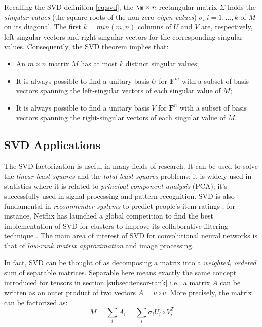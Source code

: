 Recalling the SVD definition \ref{eq:svd}, the $\m \times n$ rectangular matrix $\Sigma$ holds the  \emph{singular values} (the square roots of the non-zero \emph{eigen-values})  $\sigma_i \: i=1, \ldots, k$ of $M$ on its diagonal. The first $k = min(m,n)$ columns of $U$ and $V$ are, respectively, left-singular vectors and right-singular vectors for the corresponding singular values. Consequently, the SVD theorem implies that: 
\begin{itemize}
	\item An $m \times n$ matrix $M$ has at most $k$ distinct singular values; 
    \item It is always possible to find a unitary basis $U$ for $\mathbf{F}^m$ with a subset of basis vectors spanning the left-singular vectors of each singular value of $M$; 
    
    \item It is always possible to find a unitary basis $V$ for $\mathbf{F}^n$ with a subset of basis vectors spanning the right-singular vectors of each singular value of $M$.
\end{itemize} 


\subsection{SVD Applications}
The SVD factorization is useful in  many fields of research. It can be used to solve the \emph{linear least-squares} and the \emph{total least-squares} problems; it is widely used in statistics where it is related to \emph{principal component analysis} (PCA); it's successfully used in signal processing and pattern recognition. SVD is also fundamental in \emph{recommender systems} to predict people's item ratings \parencite{recsys1} \parencite{recsys2}; for instance, Netflix has launched a global competition to find the best implementation of SVD for clusters to improve its collaborative filtering technique \parencite{recsys3-netflix}. The main area of interest of SVD for convolutional neural networks is that of \emph{low-rank matrix approximation} and image processing. 

In fact, SVD can be thought of as decomposing a matrix into a \emph{weighted, ordered} sum of separable matrices. Separable here means exactly the same concept introduced for tensors in section \ref{subsec:tensor-rank} i.e., a matrix $A$ can be written as an outer product of two vectors $A = u \circ v$. More precisely, the matrix can be factorized as: 
\begin{equation}
  M = \sum_i A_i = \sum_i \sigma_i U_i \circ V_{i}^{T}  
\end{equation} 

